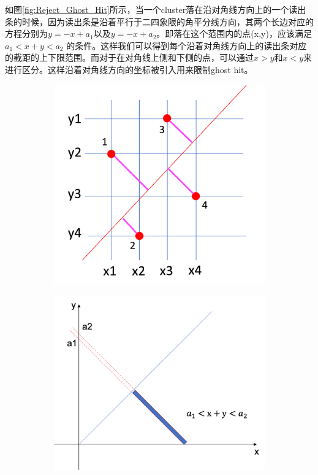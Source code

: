 如图\ref{fig:Reject_Ghost_Hit}所示，当一个cluster落在沿对角线方向上的一个读出条的时候，因为读出条是沿着平行于二四象限的角平分线方向，其两个长边对应的方程分别为$y = -x+a_1$以及$y = -x+a_2$。即落在这个范围内的点(x,y)，应该满足$ a_1 < x+y < a_2 $ 的条件。这样我们可以得到每个沿着对角线方向上的读出条对应的截距的上下限范围。而对于在对角线上侧和下侧的点，可以通过$x>y$和$x < y$来进行区分。这样沿着对角线方向的坐标被引入用来限制ghost hit。

\begin{figure}[htb]
    \centering
    \begin{subfigure}[b]{0.45\textwidth}
        \centering
        \includegraphics[width=\textwidth,clip]{figures/Chapter3/Ghost_hit.png}
        \caption{}
        \label{fig:Ghost_hit}
    \end{subfigure}
    \hfill
    \begin{subfigure}[b]{0.45\textwidth}
        \centering
        \includegraphics[width=\textwidth,clip]{figures/Chapter3/Reject_Ghost_Hit.png}

\end{subfigure}
\end{figure}
